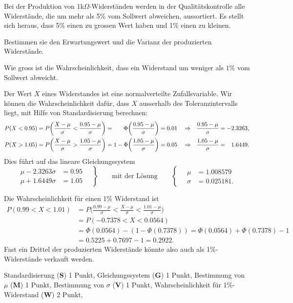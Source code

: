 Bei der Produktion von 1k$\Omega$-Widerständen werden in der
Qualitätskontrolle alle Widerstände, die um mehr als 5\% vom Sollwert
abweichen, aussortiert.
Es stellt sich heraus, dass 5\% einen zu grossen Wert haben und
1\% einen zu kleinen.
\begin{teilaufgaben}
\item
Bestimmen sie den Erwartungswert und die Varianz der produzierten
Widerstände.
\item
Wie gross ist die Wahrscheinlichkeit, dass ein Widerstand um weniger
als $1\%$ vom Sollwert abweicht.
\end{teilaufgaben}

\begin{loesung}
\begin{teilaufgaben}
\item
Der Wert $X$ eines Widerstandes ist eine normalverteilte Zufallsvariable.
Wir können die Wahrscheinlichkeit dafür, dass $X$ ausserhalb des
Toleranzintervalls liegt, mit Hilfe von Standardisierung berechnen:
\begin{align*}
P(X<0.95)
&=
P\biggl(\frac{X-\mu}{\sigma} < \frac{0.95-\mu}{\sigma}\biggr)
=
\phantom{1-\mathstrut}
\Phi\biggl(\frac{0.95-\mu}{\sigma}\biggr)
=
0.01
&&\Rightarrow&
\frac{0.95-\mu}{\sigma}
&=
-2.3263,
\\
P(X>1.05)
&=
P\biggl(\frac{X-\mu}{\sigma} > \frac{1.05-\mu}{\sigma}\biggr)
=
1-\Phi\biggl(\frac{1.05-\mu}{\sigma}\biggr)
=0.05
&&\Rightarrow&
\frac{1.05-\mu}{\sigma}
&=
\phantom{-}1.6449.
\end{align*}
Dies führt auf das lineare Gleichungssystem 
\[
\left.
\begin{aligned}
\mu-2.3263\sigma&=0.95\\
\mu+1.6449\sigma&=1.05
\end{aligned}
\quad
\right\}
\qquad\text{mit der Lösung}\qquad
\left\{
\quad
\begin{aligned}
\mu&=1.008579\\
\sigma&=0.025181.
\end{aligned}
\right.
\]
\item
Die Wahrscheinlichkeit für einen 1\% Widerstand ist
\begin{align*}
P(0.99<X<1.01)
&=
P\biggl(
\frac{0.99-\mu}{\sigma} < \frac{X-\mu}{\sigma} < \frac{1.01-\mu}{\sigma}
\biggr)
\\
&=
P(-0.7378 < X < 0.0564)
\\
&=
\Phi(0.0564) - (1-\Phi(0.7378))
=
\Phi(0.0564) + \Phi(0.7378) - 1
\\
&=
0.5225 + 0.7697 - 1
=
0.2922.
\end{align*}
Fast ein Drittel der produzierten Widerstände könnte also auch als
1\%-Widerstände verkauft werden.
\qedhere
\end{teilaufgaben}
\end{loesung}

\begin{bewertung}
Standardisierung ({\bf S}) 1 Punkt,
Gleichungssystem ({\bf G}) 1 Punkt,
Bestimmung von $\mu$ ({\bf M}) 1 Punkt,
Bestimmung von $\sigma$ ({\bf V}) 1 Punkt,
Wahrscheinlichkeit für 1\%-Widerstand ({\bf W}) 2 Punkt,
\end{bewertung}




